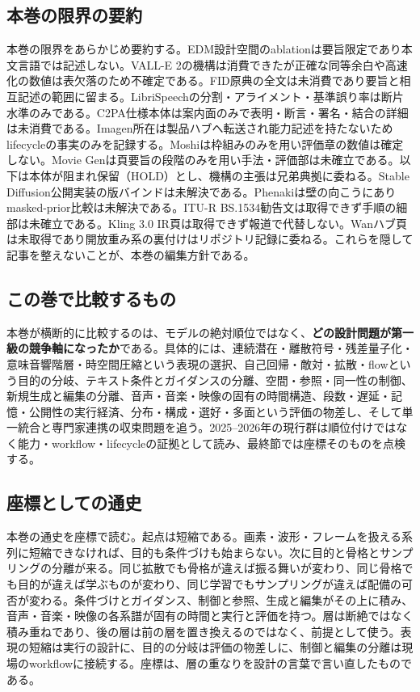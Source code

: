\documentclass[lualatex,a4paper,10pt]{jlreq}
\begin{document}
\subsection*{本巻の限界の要約}
本巻の限界をあらかじめ要約する。EDM設計空間のablationは要旨限定であり本文言語では記述しない\autocite{btd022}。VALL-E 2の機構は消費できたが正確な同等余白や高速化の数値は表欠落のため不確定である\autocite{btd059}。FID原典の全文は未消費であり要旨と相互記述の範囲に留まる\autocite{btd083}。LibriSpeechの分割・アライメント・基準誤り率は断片水準のみである\autocite{btd089}。C2PA仕様本体は案内面のみで表明・断言・署名・結合の詳細は未消費である\autocite{btd098}。Imagen所在は製品ハブへ転送され能力記述を持たないためlifecycleの事実のみを記録する\autocite{btd106}。Moshiは枠組みのみを用い評価章の数値は確定しない\autocite{btd134}。Movie Genは頁要旨の段階のみを用い手法・評価部は未確立である\autocite{btd076}。以下は本体が阻まれ保留（HOLD）とし、機構の主張は兄弟典拠に委ねる。Stable Diffusion公開実装の版バインドは未解決である\autocite{btd024}。Phenakiは壁の向こうにありmasked-prior比較は未解決である\autocite{btd072}。ITU-R BS.1534勧告文は取得できず手順の細部は未確立である\autocite{btd091}。Kling 3.0 IR頁は取得できず報道で代替しない\autocite{btd120}。Wanハブ頁は未取得であり開放重み系の裏付けはリポジトリ記録に委ねる\autocite{btd125}。これらを隠して記事を整えないことが、本巻の編集方針である。

\subsection*{この巻で比較するもの}
本巻が横断的に比較するのは、モデルの絶対順位ではなく、\textbf{どの設計問題が第一級の競争軸になったか}である。具体的には、連続潜在・離散符号・残差量子化・意味音響階層・時空間圧縮という表現の選択、自己回帰・敵対・拡散・flowという目的の分岐、テキスト条件とガイダンスの分離、空間・参照・同一性の制御、新規生成と編集の分離、音声・音楽・映像の固有の時間構造、段数・遅延・記憶・公開性の実行経済、分布・構成・選好・多面という評価の物差し、そして単一統合と専門家連携の収束問題を追う。2025--2026年の現行群は順位付けではなく能力・workflow・lifecycleの証拠として読み、最終節では座標そのものを点検する。

\subsection*{座標としての通史}
本巻の通史を座標で読む。起点は短縮である。画素・波形・フレームを扱える系列に短縮できなければ、目的も条件づけも始まらない。次に目的と骨格とサンプリングの分離が来る。同じ拡散でも骨格が違えば振る舞いが変わり、同じ骨格でも目的が違えば学ぶものが変わり、同じ学習でもサンプリングが違えば配備の可否が変わる。条件づけとガイダンス、制御と参照、生成と編集がその上に積み、音声・音楽・映像の各系譜が固有の時間と実行と評価を持つ。層は断絶ではなく積み重ねであり、後の層は前の層を置き換えるのではなく、前提として使う。表現の短縮は実行の設計に、目的の分岐は評価の物差しに、制御と編集の分離は現場のworkflowに接続する。座標は、層の重なりを設計の言葉で言い直したものである。
\end{document}
